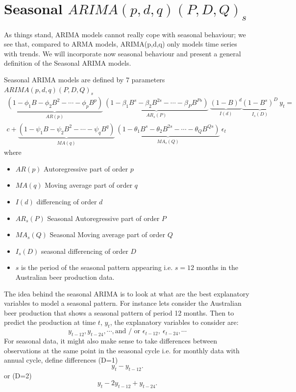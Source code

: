 \documentclass[a4paper,11pt,oneside,onecolumn]{book}
\begin{document}
\section{Seasonal $ARIMA(p,d,q)(P,D,Q)_s$}
\label{sec:seasonal:ARIMA}
 As things stand, ARIMA models cannot really cope with seasonal
behaviour; we see that, compared to ARMA models, ARIMA(p,d,q) only models time series with trends.
 We will incorporate now seasonal behaviour and present a general definition of the Seasonal ARIMA models.


\begin{definition}
Seasonal ARIMA models are defined by 7 parameters  $ARIMA(p,d,q)(P,D,Q)_s$ 
\begin{multline}
 \underbrace{(1-\phi_1 B-\phi_2 B^2-\cdots-\phi_{p} B^{p})}_{AR(p)}\  \underbrace{(1-\beta_1 B^s-\beta_2 B^{2s}-\cdots-\beta_{P} B^{Ps})}_{AR_s(P)}\ \underbrace{(1-B)^d}_{I(d)} \underbrace{(1-B^s)^D}_{I_s(D)}\ y_t  = \\
c+ \underbrace{(1-\psi_1 B-\psi_2 B^2-\cdots-\psi_{q} B^{q})}_{MA(q)}\ \underbrace{(1-\theta_1 B^s-\theta_2 B^{2s}-\cdots-\theta_{Q} B^{Qs})}_{MA_s(Q)}\ \epsilon_t
\end{multline}
where 
\begin{itemize}
\item $AR(p)$ Autoregressive part of order $p$
\item  $MA(q)$ Moving average part of order $q$
\item $I(d)$  differencing of order $d$
\item $AR_s(P)$ Seasonal Autoregressive part of order $P$
\item  $MA_s(Q)$ Seasonal Moving average part of order $Q$
\item $I_s(D)$   seasonal differencing of order $D$
\item $s$  is the period of the seasonal pattern appearing i.e. $s=12$ months in the Australian beer production data.
\end{itemize}
\end{definition}


The idea behind the seasonal ARIMA is to look at what are the best explanatory variables to model a seasonal pattern.
For instance lets consider the Australian beer production that shows a seasonal pattern of period 12 months.
Then to predict the production at time $t$, $y_t$, the explanatory variables to consider are:
$$
y_{t-12},  y_{t-24},\cdots,\text{and /  or } \epsilon_{t-12},\ \epsilon_{t-24}, \cdots
$$  
For seasonal data, it might also 
make sense to take differences between observations at the same
point in the seasonal cycle i.e. for monthly data with annual cycle,
define differences (D=1)
\[ y_t - y_{t-12}. \]
or (D=2)
\[ y_t -2 y_{t-12}+ y_{t-24}.  \]
\end{document}
